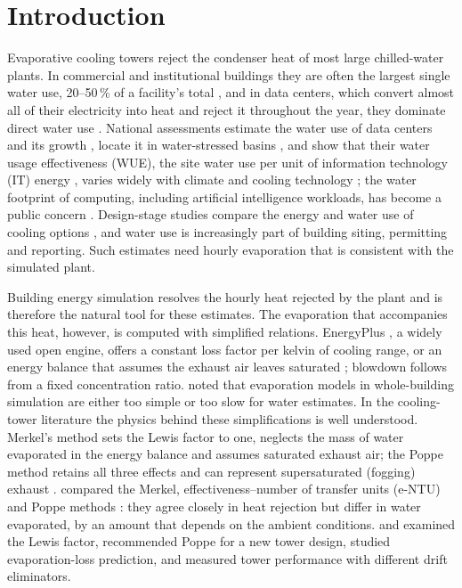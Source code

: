 \documentclass[preprint,12pt]{elsarticle}
\begin{document}
\section{Introduction}\label{sec:intro}
Evaporative cooling towers reject the condenser heat of most large chilled-water plants. In commercial and
institutional buildings they are often the largest single water use, 20--50\,\% of a facility's total
\citep{epa2012watersense}, and in data centers, which convert almost all of their electricity into heat and reject it
throughout the year, they dominate direct water use \citep{mytton2021data,shehabi2016united}. National assessments
estimate the water use of data centers and its growth \citep{shehabi2024united}, locate it in water-stressed basins
\citep{siddik2021environmental}, and show that their water usage effectiveness (WUE), the site water use per unit of
information technology (IT) energy \citep{greengrid2011wue}, varies widely with climate and cooling technology
\citep{lei2022climate}; the water footprint of computing, including artificial intelligence workloads, has become a
public concern \citep{ristic2015water,li2025making}. Design-stage studies compare the energy and water use of cooling
options \citep{karimi2022water,karimi2025energy}, and water use is increasingly part of building siting, permitting and
reporting. Such estimates need hourly evaporation that is consistent with the simulated plant.

Building energy simulation resolves the hourly heat rejected by the plant and is therefore the natural tool for these
estimates. The evaporation that accompanies this heat, however, is computed with simplified relations. EnergyPlus
\citep{crawley2001energyplus}, a widely used open engine, offers a constant loss factor per kelvin of cooling range, or
an energy balance that assumes the exhaust air leaves saturated \citep{doe2022engref}; blowdown follows from a fixed
concentration ratio. \citet{powers2016new} noted that evaporation models in whole-building simulation are either too
simple or too slow for water estimates. In the cooling-tower literature the physics behind these simplifications is well
understood. Merkel's method \citep{merkel1925verdunstungskuhlung} sets the Lewis factor to one, neglects the mass of
water evaporated in the energy balance and assumes saturated exhaust air; the Poppe method \citep{poppe1991berechnung}
retains all three effects and can represent supersaturated (fogging) exhaust \citep{klimanek2009solution}.
\citet{kloppers2005critical,kloppers2005cooling} compared the Merkel, effectiveness--number of transfer units (e-NTU)
\citep{jaber1989design} and Poppe methods \citep{kroger2004air}: they agree closely in heat rejection but differ in
water evaporated, by an amount that depends on the ambient conditions. \citet{kloppers2005lewis} and
\citet{khan2001improved} examined the Lewis factor, \citet{navarro2022critical} recommended Poppe for a new tower design,
\citet{qureshi2006prediction} studied evaporation-loss prediction, and \citet{lucas2009experimental} measured tower
performance with different drift eliminators.
\end{document}
